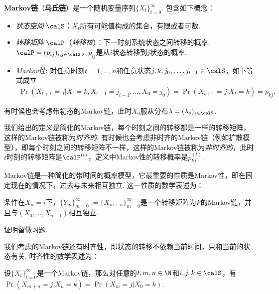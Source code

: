 \begin{definition}[Markov链]
\textbf{Markov链}（\textbf{马氏链}）是一个随机变量序列$\{X_t\}_{t=0}^{\infty}$. 包含如下概念：
\begin{itemize}
	\item \emph{状态空间} $\calS$：$X_t$所有可能值构成的集合，有限或者可数.
	\item \emph{转移矩阵} $\calP$（\emph{转移核}）：下一时刻系统状态之间转移的概率. $\calP=(p_{ij})_{i,j\in \calS}$，$p_{ij}$是从$i$状态转移到$j$状态的概率.
	\item \emph{Markov性}: 对任意时刻$t=1,\dots,n$和任意状态$j,k,j_0,\dots,j_{t-1}\in \calS$，如下等式成立
		\begin{align*}
		   \Pr(X_{t+1}=j| X_t=k,X_{t-1}=j_{t-1},\dots,X_0=j_0)= \Pr(X_{t+1}=j| X_{t}=k)=p_{kj}.
		\end{align*}
    \end{itemize}
    有时候也会考虑带初态的Markov链，此时$X_0$服从分布$\lambda=(\lambda_s)_{s\in \calS}$.
\end{definition}
我们给出的定义是简化的Markov链，每个时刻之间的转移都是一样的转移矩阵，这样的Markov链被称为\emph{时齐的}. 有时候也会考虑非时齐的Markov链（例如扩散模型），即每个时刻之间的转移矩阵不一样，这样的Markov链被称为\emph{非时齐的}，此时$t$时刻的转移矩阵是$\calP^{(t)}$，定义中Markov性的转移概率是$p_{kj}^{(t)}$.

Markov链是一种简化的带时间的概率模型，它最重要的性质是Markov性，即在固定现在的情况下，过去与未来相互独立. 这一性质的数学表述为：
\begin{proposition}[Markov性]\label{prop:markov}
条件在$X_n=i$下，$\{Y_m\}_{m=0}^{\infty}:=\{X_{m+n}\}_{m=0}^{\infty}$是一个转移矩阵为$P$的Markov链，并且与$(X_0,\dots,X_{n-1})$相互独立. %
\end{proposition}
证明留做习题. 

我们考虑的Markov链还有时齐性，即状态的转移不依赖当前时间，只和当前的状态有关. 时齐性的数学表述为：
\begin{proposition}
    设$\{X_t\}_{t=0}^{\infty}$是一个Markov链，那么对任意的$t,m,n\in \N$和$i,j,k\in \calS$，有
    $\Pr(X_{m+n}=j| X_{n}=k)=\Pr(X_{m}=j| X_{0}=k)$.
\end{proposition}

